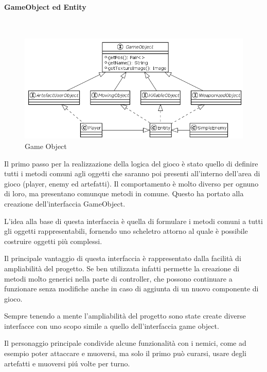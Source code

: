 \documentclass[a4paper,titlepage,12pt]{article}
\begin{document}
\paragraph{GameObject ed Entity}
\par \noindent \\
\begin{figure}[H]
    \centering
    \includegraphics[scale=0.55]{img/uml/GameObject.png}
    \caption{Game Object}
    \label{fig: Game Object}
\end{figure}
\par \noindent Il primo passo per la realizzazione della logica del gioco è stato quello di definire tutti i metodi comuni agli oggetti che saranno poi presenti all’interno dell’area di gioco (player, enemy ed artefatti). Il comportamento è molto diverso per ognuno di loro, ma presentano comunque metodi in comune. Questo ha portato alla creazione dell’interfaccia GameObject.
\par \noindent L’idea alla base di questa interfaccia è quella di formulare i metodi comuni a tutti gli oggetti rappresentabili, fornendo uno scheletro attorno al quale è possibile costruire oggetti più complessi.
\par \noindent Il principale vantaggio di questa interfaccia è rappresentato dalla facilità di ampliabilità del progetto. Se ben utilizzata infatti permette la creazione di metodi molto generici nella parte di controller, che possono continuare a funzionare senza modifiche anche in caso di aggiunta di un nuovo componente di gioco. 
\par \noindent Sempre tenendo a mente l’ampliabilità del progetto sono state create diverse interfacce con uno scopo simile a quello dell’interfaccia game object. 
\par \noindent Il personaggio principale condivide alcune funzionalità con i nemici, come ad esempio poter attaccare e muoversi, ma solo il primo può curarsi, usare degli artefatti e muoversi piú volte per turno.
\end{document}
